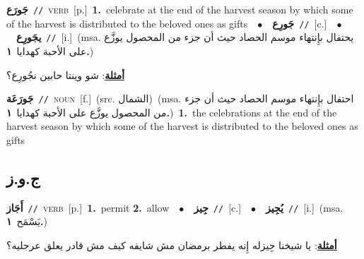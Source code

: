 \documentclass[10pt,a4paper,twoside]{article} %
\begin{document}
\begin{multicols}{2}
{\setlength\topsep{0pt}\textbf{\foreignlanguage{arabic}{جَورَع}}\ {\color{gray}\texttt{//}\color{black}}\ \textsc{verb}\ [p.]\ \textbf{1.}~celebrate at the end of the harvest season by which some of the harvest is distributed to the beloved ones as gifts\ \ $\bullet$\ \ \setlength\topsep{0pt}\textbf{\foreignlanguage{arabic}{جَورِع}}\ {\color{gray}\texttt{//}\color{black}}\ [c.]\ \ $\bullet$\ \ \setlength\topsep{0pt}\textbf{\foreignlanguage{arabic}{يجَورِع}}\ {\color{gray}\texttt{//}\color{black}}\ [i.]\ \color{gray}(msa. \foreignlanguage{arabic}{يحتفال بإِنتهاء موسم الحصاد حيث أن جزء من المحصول يوزَّع على الأحبة كهدايا}~\foreignlanguage{arabic}{\textbf{١.}})\color{black}\  \begin{flushright}\color{gray}\foreignlanguage{arabic}{\textbf{\underline{\foreignlanguage{arabic}{أمثلة}}}: شو وينتا حابين نجُورِع؟}\end{flushright}\color{black}} \vspace{2mm}

{\setlength\topsep{0pt}\textbf{\foreignlanguage{arabic}{جَورَعَة}}\ {\color{gray}\texttt{//}\color{black}}\ \textsc{noun}\ [f.]\ (src. \color{gray}\foreignlanguage{arabic}{الشمال}\color{black})\ \color{gray}(msa. \foreignlanguage{arabic}{احتفال بإِنتهاء موسم الحصاد حيث أن جزء من المحصول يوزَّع على الأحبة كهدايا}~\foreignlanguage{arabic}{\textbf{١.}})\color{black}\ \textbf{1.}~the celebrations at the end of the harvest season by which some of the harvest is distributed to the beloved ones as gifts\ } \vspace{2mm}

\vspace{-3mm}
\subsection*{\color{blue}\foreignlanguage{arabic}{ج.و.ز}\color{blue}{}} 

{\setlength\topsep{0pt}\textbf{\foreignlanguage{arabic}{أَجَاز}}\ {\color{gray}\texttt{//}\color{black}}\ \textsc{verb}\ [p.]\ \textbf{1.}~permit  \textbf{2.}~allow\ \ $\bullet$\ \ \setlength\topsep{0pt}\textbf{\foreignlanguage{arabic}{جِيز}}\ {\color{gray}\texttt{//}\color{black}}\ [c.]\ \ $\bullet$\ \ \setlength\topsep{0pt}\textbf{\foreignlanguage{arabic}{يُجِيز}}\ {\color{gray}\texttt{//}\color{black}}\ [i.]\ \color{gray}(msa. \foreignlanguage{arabic}{يَسْمَح}~\foreignlanguage{arabic}{\textbf{١.}})\color{black}\  \begin{flushright}\color{gray}\foreignlanguage{arabic}{\textbf{\underline{\foreignlanguage{arabic}{أمثلة}}}: يا شيخنا جِيزله إِنه يفطر برمضان مش شايفه كيف مش قادر يعلق عرجليه؟}\end{flushright}\color{black}} \vspace{2mm}


\end{multicols}
\end{document}
